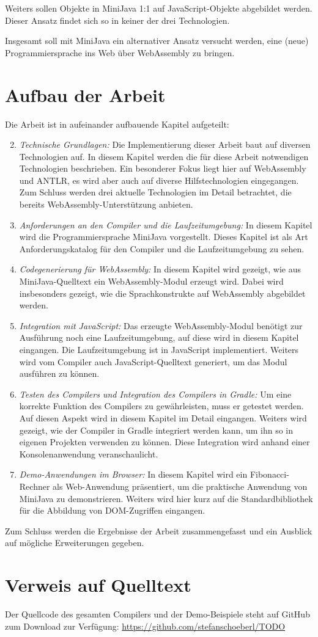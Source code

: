 Weiters sollen Objekte in MiniJava 1:1 auf JavaScript-Objekte abgebildet werden. Dieser Ansatz findet sich so in keiner der drei Technologien.

Insgesamt soll mit MiniJava ein alternativer Ansatz versucht werden, eine (neue) Programmiersprache ins Web über WebAssembly zu bringen.

\section{Aufbau der Arbeit}

Die Arbeit ist in aufeinander aufbauende Kapitel aufgeteilt:
\begin{enumerate}
    \setcounter{enumi}{1}
    \item \emph{Technische Grundlagen:} Die Implementierung dieser Arbeit baut auf diversen Technologien auf. In diesem Kapitel werden die für diese Arbeit notwendigen Technologien beschrieben. Ein besonderer Fokus liegt hier auf WebAssembly und ANTLR, es wird aber auch auf diverse Hilfstechnologien eingegangen. Zum Schluss werden drei aktuelle Technologien im Detail betrachtet, die bereits WebAssembly-Unterstützung anbieten.
    \item \emph{Anforderungen an den Compiler und die Laufzeitumgebung:} In diesem Kapitel wird die Programmiersprache MiniJava vorgestellt. Dieses Kapitel ist als Art Anforderungskatalog für den Compiler und die Laufzeitumgebung zu sehen.
    \item \emph{Codegenerierung für WebAssembly:} In diesem Kapitel wird gezeigt, wie aus MiniJava-Quelltext ein WebAssembly-Modul erzeugt wird. Dabei wird insbesonders gezeigt, wie die Sprachkonstrukte auf WebAssembly abgebildet werden. 
    \item \emph{Integration mit JavaScript:} Das erzeugte WebAssembly-Modul benötigt zur Ausführung noch eine Laufzeitumgebung, auf diese wird in diesem Kapitel eingangen. Die Laufzeitumgebung ist in JavaScript implementiert. Weiters wird vom Compiler auch JavaScript-Quelltext generiert, um das Modul ausführen zu können.
    \item \emph{Testen des Compilers und Integration des Compilers in Gradle:} Um eine korrekte Funktion des Compilers zu gewährleisten, muss er getestet werden. Auf diesen Aspekt wird in diesem Kapitel im Detail eingangen. Weiters wird gezeigt, wie der Compiler in Gradle integriert werden kann, um ihn so in eigenen Projekten verwenden zu können. Diese Integration wird anhand einer Konsolenanwendung veranschaulicht.
    \item \emph{Demo-Anwendungen im Browser:} In diesem Kapitel wird ein Fibonacci-Rechner als Web-Anwendung präsentiert, um die praktische Anwendung von MiniJava zu demonstrieren. Weiters wird hier kurz auf die Standardbibliothek für die Abbildung von DOM-Zugriffen eingangen.
\end{enumerate}

Zum Schluss werden die Ergebnisse der Arbeit zusammengefasst und ein Ausblick auf mögliche Erweiterungen gegeben.

\section{Verweis auf Quelltext}
Der Quellcode des gesamten Compilers und der Demo-Beispiele steht auf GitHub zum Download zur Verfügung: \url{https://github.com/stefanschoeberl/TODO}
